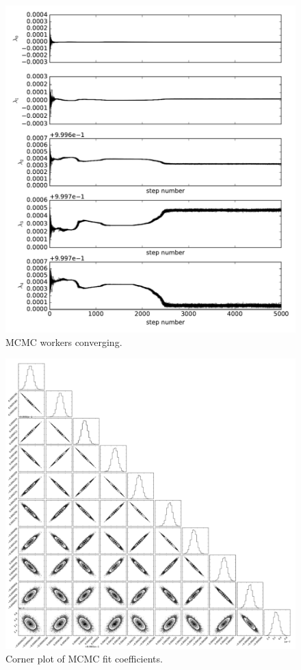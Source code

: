\begin{figure}[ht]
  \includegraphics[width=\columnwidth]{img/line-time.pdf}
  \caption{MCMC workers converging.}
  \label{fig:MCMC_time}
\end{figure}

\begin{figure}[ht]
  \includegraphics[width=\columnwidth]{img/line-triangle.pdf}
  \caption{Corner plot of MCMC fit coefficients.}
  \label{fig:MCMC_triangle}
\end{figure}

